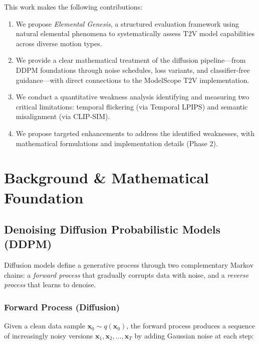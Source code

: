 \documentclass[conference]{IEEEtran}
\begin{document}
This work makes the following contributions:
\begin{enumerate}
    \item We propose \textit{Elemental Genesis}, a structured evaluation framework using natural elemental phenomena to systematically assess T2V model capabilities across diverse motion types.
    \item We provide a clear mathematical treatment of the diffusion pipeline---from DDPM foundations through noise schedules, loss variants, and classifier-free guidance---with direct connections to the ModelScope T2V implementation.
    \item We conduct a quantitative weakness analysis identifying and measuring two critical limitations: temporal flickering (via Temporal LPIPS) and semantic misalignment (via CLIP-SIM).
    \item We propose targeted enhancements to address the identified weaknesses, with mathematical formulations and implementation details (Phase 2).
\end{enumerate}

\section{Background \& Mathematical Foundation}

\subsection{Denoising Diffusion Probabilistic Models (DDPM)}

Diffusion models \cite{ho2020ddpm, sohl2015deep} define a generative process through two complementary Markov chains: a \textit{forward process} that gradually corrupts data with noise, and a \textit{reverse process} that learns to denoise.

\subsubsection{Forward Process (Diffusion)}

Given a clean data sample $\mathbf{x}_0 \sim q(\mathbf{x}_0)$, the forward process produces a sequence of increasingly noisy versions $\mathbf{x}_1, \mathbf{x}_2, \ldots, \mathbf{x}_T$ by adding Gaussian noise at each step:
\end{document}
